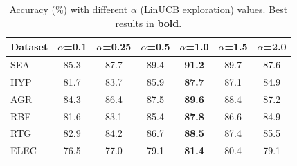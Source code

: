 \begin{table}[t]
\centering
\caption{Accuracy (\%) with different $\alpha$ (LinUCB exploration) values. Best results in \textbf{bold}.}
\label{tab:alpha_sensitivity}
\begin{tabular}{lcccccc}
\toprule
Dataset & $\alpha$=0.1 & $\alpha$=0.25 & $\alpha$=0.5 & $\alpha$=1.0 & $\alpha$=1.5 & $\alpha$=2.0 \\
\midrule
SEA & 85.3 & 87.7 & 89.4 & \textbf{91.2} & 89.7 & 87.6 \\
HYP & 81.7 & 83.7 & 85.9 & \textbf{87.7} & 87.1 & 84.9 \\
AGR & 84.3 & 86.4 & 87.5 & \textbf{89.6} & 88.4 & 87.2 \\
RBF & 81.6 & 83.1 & 85.4 & \textbf{87.8} & 86.6 & 84.9 \\
RTG & 82.9 & 84.2 & 86.7 & \textbf{88.5} & 87.4 & 85.5 \\
ELEC & 76.5 & 77.0 & 79.1 & \textbf{81.4} & 80.4 & 79.1 \\
\bottomrule
\end{tabular}
\end{table}